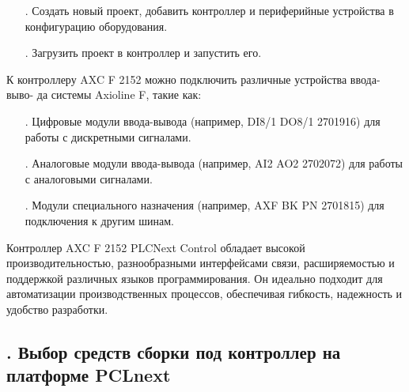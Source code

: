 {\begin{itemize}[leftmargin=2.15cm, labelwidth=0.65cm, labelsep=0.0cm]
		\item[\theitemcntr. ] Создать новый проект, добавить контроллер и периферийные устройства в конфигурацию оборудования.
		\addtocounter{itemcntr}{1}

		\item[\theitemcntr. ] Загрузить проект в контроллер и запустить его.
		\addtocounter{itemcntr}{1}

	\end{itemize} \setcounter{itemcntr}{1}

	\par \redline К контроллеру AXC F 2152 можно подключить различные устройства ввода-выво- да системы Axioline F, такие как:

	\begin{itemize}[leftmargin=2.15cm, labelwidth=0.65cm, labelsep=0.0cm] 

		\item[\theitemcntr. ] Цифровые модули ввода-вывода (например, DI8/1 DO8/1 2701916) для работы с дискретными сигналами. 
		\addtocounter{itemcntr}{1}

		\item[\theitemcntr. ] Аналоговые модули ввода-вывода (например, AI2 AO2 2702072) для работы с аналоговыми сигналами. 
		\addtocounter{itemcntr}{1}

		\item[\theitemcntr. ] Модули специального назначения (например, AXF BK PN 2701815) для подключения к другим шинам.
		\addtocounter{itemcntr}{1}

	\end{itemize} \setcounter{itemcntr}{1}

	\par \redline Контроллер AXC F 2152 PLCNext Control обладает высокой производительностью, разнообразными интерфейсами связи, расширяемостью и поддержкой различных языков программирования. Он идеально подходит для автоматизации производственных процессов, обеспечивая гибкость, надежность и удобство разработки.

	\par
}

\subtitlespace

\subsection*{
	\gostTitleFont
	\redline
	\thechaptercntr .\thesubchaptercntr \spc
	Выбор средств сборки под контроллер на платформе PCLnext
} \addtocounter{subchaptercntr}{1}

